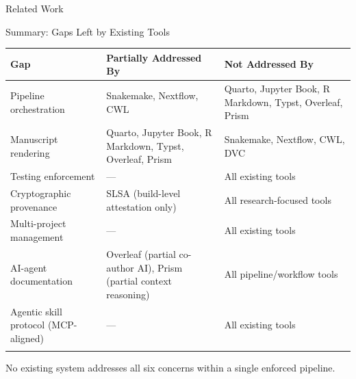 \documentclass[
  ignorenonframetext,
]{beamer}
\newcounter{none} %
\begin{document}
\begin{frame}{Related Work}
\begin{block}{Summary: Gaps Left by Existing Tools}
{\def\LTcaptype{none} %
\begin{longtable}[]{@{}
  >{\raggedright\arraybackslash}p{}
  >{\raggedright\arraybackslash}p{}
  >{\raggedright\arraybackslash}p{}@{}}
\toprule\noalign{}
\begin{minipage}[b]{\linewidth}\raggedright
Gap
\end{minipage} & \begin{minipage}[b]{\linewidth}\raggedright
Partially Addressed By
\end{minipage} & \begin{minipage}[b]{\linewidth}\raggedright
Not Addressed By
\end{minipage} \\
\midrule\noalign{}
\endhead
Pipeline orchestration & Snakemake, Nextflow, CWL & Quarto, Jupyter
Book, R Markdown, Typst, Overleaf, Prism \\
Manuscript rendering & Quarto, Jupyter Book, R Markdown, Typst,
Overleaf, Prism & Snakemake, Nextflow, CWL, DVC \\
Testing enforcement & --- & All existing tools \\
Cryptographic provenance & SLSA (build-level attestation only) & All
research-focused tools \\
Multi-project management & --- & All existing tools \\
AI-agent documentation & Overleaf (partial co-author AI), Prism (partial
context reasoning) & All pipeline/workflow tools \\
Agentic skill protocol (MCP-aligned) & --- & All existing tools \\
\bottomrule\noalign{}
\end{longtable}
}

No existing system addresses all six concerns within a single enforced
pipeline.
\end{block}
\end{frame}
\end{document}
